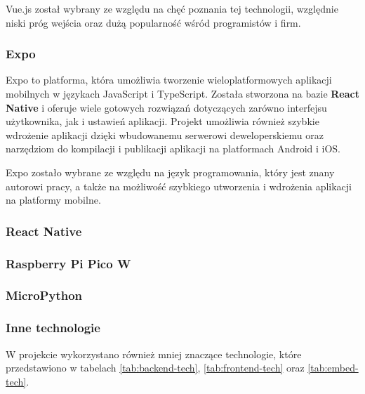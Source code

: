 Vue.js został wybrany ze względu na chęć poznania tej technologii, względnie niski próg wejścia oraz dużą popularność wśród programistów i firm.

\subsubsection*{Expo}

Expo to platforma, która umożliwia tworzenie wieloplatformowych aplikacji mobilnych w językach JavaScript i TypeScript. Została stworzona na bazie {\bfseries React Native} i oferuje wiele gotowych rozwiązań dotyczących zarówno interfejsu użytkownika, jak i ustawień aplikacji. Projekt umożliwia również szybkie wdrożenie aplikacji dzięki wbudowanemu serwerowi deweloperskiemu oraz narzędziom do kompilacji i publikacji aplikacji na platformach Android i iOS. \cite{bib:expo}

Expo zostało wybrane ze względu na język programowania, który jest znany autorowi pracy, a także na możliwość szybkiego utworzenia i wdrożenia aplikacji na platformy mobilne.

\subsubsection*{React Native}

\subsubsection*{Raspberry Pi Pico W}

\cite{bib:picoW}

\subsubsection*{MicroPython}

\cite{bib:microPython}

\subsubsection*{Inne technologie}

W projekcie wykorzystano również mniej znaczące technologie, które przedstawiono w tabelach \ref{tab:backend-tech}, \ref{tab:frontend-tech} oraz \ref{tab:embed-tech}.


